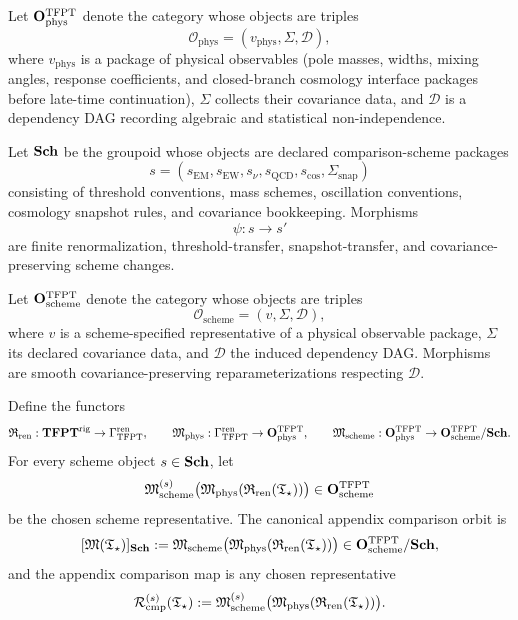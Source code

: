 \begin{definition}
\label{def:physical-observable-category}
Let $\mathbf O_{\mathrm{phys}}^{\mathrm{TFPT}}$ denote the category whose objects are triples
\[
\mathcal O_{\mathrm{phys}}=(v_{\mathrm{phys}},\Sigma,\mathcal D),
\]
where $v_{\mathrm{phys}}$ is a package of physical observables (pole masses, widths, mixing angles,
response coefficients, and closed-branch cosmology interface packages before late-time
continuation), $\Sigma$ collects their covariance data, and
$\mathcal D$ is a dependency DAG recording algebraic and statistical non-independence.
\end{definition}

\begin{definition}
\label{def:scheme-groupoid}
Let $\mathbf{Sch}$ be the groupoid whose objects are declared comparison-scheme packages
\[
s=(s_{\mathrm{EM}},s_{\mathrm{EW}},s_{\nu},s_{\mathrm{QCD}},s_{\mathrm{cos}},\Sigma_{\mathrm{snap}})
\]
consisting of threshold conventions, mass schemes, oscillation conventions, cosmology snapshot
rules, and covariance bookkeeping. Morphisms
\[
\psi:s\to s'
\]
are finite renormalization, threshold-transfer, snapshot-transfer, and covariance-preserving
scheme changes.
\end{definition}

\begin{definition}
\label{def:obs-category}
Let $\mathbf O_{\mathrm{scheme}}^{\mathrm{TFPT}}$ denote the category whose objects are triples
\[
\mathcal O_{\mathrm{scheme}}=(v,\Sigma,\mathcal D),
\]
where $v$ is a scheme-specified representative of a physical observable package, $\Sigma$ its
declared covariance data, and $\mathcal D$ the induced dependency DAG. Morphisms are smooth
covariance-preserving reparameterizations respecting $\mathcal D$.
\end{definition}

\begin{definition}
\label{def:canonical-measurement-orbit}
Define the functors
\[
\mathfrak R_{\mathrm{ren}}:\mathbf{TFPT}^{\mathrm{rig}}\to\Gamma_{\mathrm{TFPT}}^{\mathrm{ren}},
\qquad
\mathfrak M_{\mathrm{phys}}:\Gamma_{\mathrm{TFPT}}^{\mathrm{ren}}\to\mathbf O_{\mathrm{phys}}^{\mathrm{TFPT}},
\qquad
\mathfrak M_{\mathrm{scheme}}:\mathbf O_{\mathrm{phys}}^{\mathrm{TFPT}}\to\mathbf O_{\mathrm{scheme}}^{\mathrm{TFPT}}/\mathbf{Sch}.
\]
For every scheme object $s\in\mathbf{Sch}$, let
\[
\mathfrak M_{\mathrm{scheme}}^{(s)}\bigl(\mathfrak M_{\mathrm{phys}}(\mathfrak R_{\mathrm{ren}}(\mathfrak T_{\star}))\bigr)\in\mathbf O_{\mathrm{scheme}}^{\mathrm{TFPT}}
\]
be the chosen scheme representative. The canonical appendix comparison orbit is
\[
[\mathfrak M(\mathfrak T_{\star})]_{\mathbf{Sch}}
:=
\mathfrak M_{\mathrm{scheme}}\bigl(\mathfrak M_{\mathrm{phys}}(\mathfrak R_{\mathrm{ren}}(\mathfrak T_{\star}))\bigr)
\in \mathbf O_{\mathrm{scheme}}^{\mathrm{TFPT}}/\mathbf{Sch},
\]
and the appendix comparison map is any chosen representative
\[
\mathcal R_{\mathrm{cmp}}^{(s)}(\mathfrak T_{\star}):=
\mathfrak M_{\mathrm{scheme}}^{(s)}\bigl(\mathfrak M_{\mathrm{phys}}(\mathfrak R_{\mathrm{ren}}(\mathfrak T_{\star}))\bigr).
\]
\end{definition}

